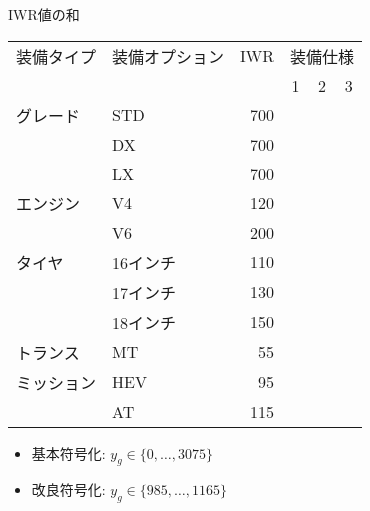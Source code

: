 \begin{frame}{IWR値の和}
\begin{exampleblock}{}
 \centering
 \begin{tabular}{l|l|r|c|c|c} 
  装備タイプ & 装備オプション & IWR & \multicolumn{3}{c}{装備仕様} \\\cline{4-6}
                &       &	& 1	& 2	& 3	\\\cline{1-6}
  グレード 	&STD	& 700	& 	&	&	\\
                & DX	& 700	&	& 	&	\\
                & LX	& 700 	& 	&	& 	\\\cline{1-6}
  エンジン	& V4	& 120	&	&	& 	\\
                & V6	& 200	& 	& 	& 	\\\cline{1-6}
  タイヤ	& 16インチ& 110	&	&	& 	\\
                & 17インチ& 130	&	& 	&	\\
                & 18インチ& 150	& 	&	& 	\\\cline{1-6}
  トランス	& MT    & 55	&	& 	&	\\
  ミッション	& HEV   & 95	&	& 	&	\\
                & AT	& 115	&	& 	& 	\\
 \end{tabular}
\end{exampleblock}
 \begin{itemize}
  \item 基本符号化: $y_{g}\in\{0,\ldots, 3075\} $
  \item 改良符号化: $y_{g}\in\{985,\ldots, 1165\}$
 \end{itemize}

\end{frame}